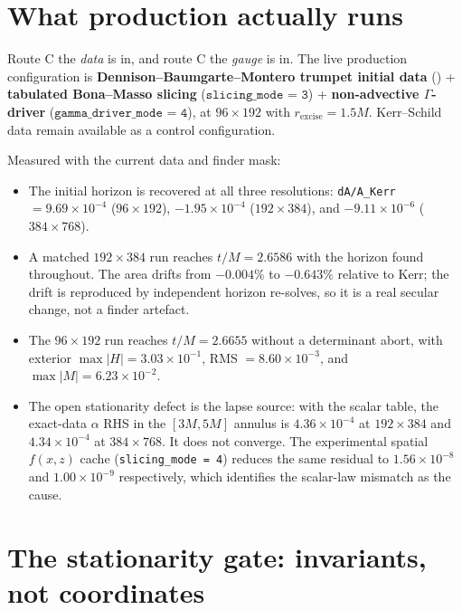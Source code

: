 \documentclass[11pt,openany]{book}
\begin{document}
\section{What production actually runs}

Route C the \emph{data} is in, and route C the \emph{gauge} is in. The live
production configuration is \textbf{Dennison--Baumgarte--Montero trumpet
initial data} () +
\textbf{tabulated Bona--Masso slicing} ($\texttt{slicing\_mode = 3}$) +
\textbf{non-advective $\Gamma$-driver} ($\texttt{gamma\_driver\_mode = 4}$),
at $96\times192$ with $r_{\mathrm{excise}} = 1.5M$. Kerr--Schild data remain
available as a control configuration.

Measured with the current data and finder mask:

\begin{itemize}
\item The initial horizon is recovered at all three resolutions:
      \texttt{dA/A\_Kerr} $= 9.69\times10^{-4}$ ($96\times192$),
      $-1.95\times10^{-4}$ ($192\times384$), and
      $-9.11\times10^{-6}$ ($384\times768$).
\item A matched $192\times384$ run reaches $t/M = 2.6586$ with the horizon
      found throughout. The area drifts from $-0.004\%$ to $-0.643\%$
      relative to Kerr; the drift is reproduced by independent horizon
      re-solves, so it is a real secular change, not a finder artefact.
\item The $96\times192$ run reaches $t/M = 2.6655$ without a determinant
      abort, with exterior $\max|H| = 3.03\times10^{-1}$,
      RMS $= 8.60\times10^{-3}$, and $\max|M| = 6.23\times10^{-2}$.
\item The open stationarity defect is the lapse source: with the scalar
      table, the exact-data $\alpha$ RHS in the $[3M,5M]$ annulus is
      $4.36\times10^{-4}$ at $192\times384$ and $4.34\times10^{-4}$ at
      $384\times768$. It does not converge. The experimental spatial
      $f(x,z)$ cache (\texttt{slicing\_mode = 4}) reduces the same residual
      to $1.56\times10^{-8}$ and $1.00\times10^{-9}$ respectively, which
      identifies the scalar-law mismatch as the cause.
\end{itemize}

\section{The stationarity gate: invariants, not coordinates}
\label{sec:invariant-gate}
\end{document}
